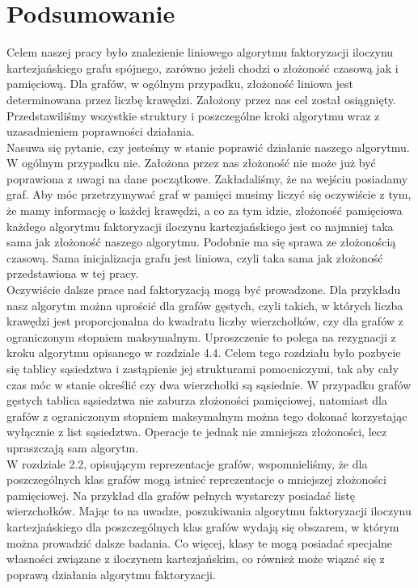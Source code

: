 \documentclass[12pt,a4paper,titlepage]{article}
\newcommand\tab[1][1cm]{\hspace*{#1}}
\begin{document}
\section{Podsumowanie}
Celem naszej pracy było znalezienie liniowego algorytmu faktoryzacji iloczynu kartezjańskiego grafu spójnego, zarówno jeżeli chodzi o złożoność czasową jak i pamięciową. Dla grafów, w ogólnym przypadku, złożoność liniowa jest determinowana przez liczbę krawędzi. Założony przez nas cel został osiągnięty. Przedstawiliśmy wszystkie struktury i poszczególne kroki algorytmu wraz z uzasadnieniem poprawności działania.\\
\tab[0.6cm]Nasuwa się pytanie, czy jesteśmy w stanie poprawić działanie naszego algorytmu. W ogólnym przypadku nie. Założona przez nas złożoność nie może już być poprawiona z uwagi na dane początkowe. Zakładaliśmy, że na wejściu posiadamy graf. Aby móc przetrzymywać graf w pamięci musimy liczyć się oczywiście z tym, że mamy informację o każdej krawędzi, a co za tym idzie, złożoność pamięciowa każdego algorytmu faktoryzacji iloczynu kartezjańskiego jest co najmniej taka sama jak złożoność naszego algorytmu. Podobnie ma się sprawa ze złożonością czasową. Sama inicjalizacja grafu jest liniowa, czyli taka sama jak złożoność przedstawiona w tej pracy.\\
\tab[0.6cm]Oczywiście dalsze prace nad faktoryzacją mogą być prowadzone. Dla przykładu nasz algorytm można uprościć dla grafów gęstych, czyli takich, w których liczba krawędzi jest proporcjonalna do kwadratu liczby wierzchołków, czy dla grafów z ograniczonym stopniem maksymalnym. Uproszczenie to polega na rezygnacji z kroku algorytmu opisanego w rozdziale 4.4. Celem tego rozdziału było pozbycie się tablicy sąsiedztwa i zastąpienie jej strukturami pomocniczymi, tak aby cały czas móc w stanie określić czy dwa wierzchołki są sąsiednie. W przypadku grafów gęstych tablica sąsiedztwa nie zaburza złożoności pamięciowej, natomiast dla grafów z ograniczonym stopniem maksymalnym można tego dokonać korzystając wyłącznie z list sąsiedztwa. Operacje te jednak nie zmniejsza złożoności, lecz upraszczają sam algorytm.\\
\tab[0.6cm]W rozdziale 2.2, opisującym reprezentacje grafów, wspomnieliśmy, że dla poszczególnych klas grafów mogą istnieć reprezentacje o mniejszej złożoności pamięciowej. Na przykład dla grafów pełnych wystarczy posiadać listę wierzchołków. Mając to na uwadze, poszukiwania algorytmu faktoryzacji iloczynu kartezjańskiego dla poszczególnych klas grafów wydają się obszarem, w którym można prowadzić dalsze badania. Co więcej, klasy te mogą posiadać specjalne własności związane z iloczynem kartezjańskim, co również może wiązać się z poprawą działania algorytmu faktoryzacji.
\end{document}
